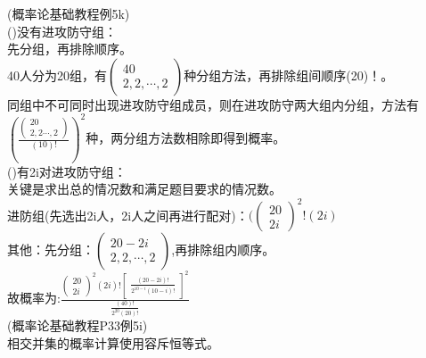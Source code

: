 \documentclass{book}%
\begin{document}
	(概率论基础教程例5k)\\
	()没有进攻防守组：\\
	先分组，再排除顺序。\\
	40人分为20组，有$\begin{pmatrix}40\\2,2,\cdots ,2\end{pmatrix}$种分组方法，再排除组间顺序(20)！。\\
	同组中不可同时出现进攻防守组成员，则在进攻防守两大组内分组，方法有${(\frac{\begin{pmatrix}20\\2,2\cdots ,2\end{pmatrix}}{(10)!})}^{2}$种，两分组方法数相除即得到概率。\\
	()有2i对进攻防守组：\\
	关键是求出总的情况数和满足题目要求的情况数。\\
	进防组(先选出2i人，2i人之间再进行配对)：$(\begin{pmatrix}20\\2i\end{pmatrix}^{2}!(2i)$\\
	其他：先分组：$\begin{pmatrix}20-2i\\2,2,\cdots ,2\end{pmatrix}$,再排除组内顺序。\\
	故概率为:$
	\frac{
	{\begin{pmatrix}20\\2i\end{pmatrix}}^{2}(2i)!
	{\begin{bmatrix}
		\frac
		{(20-2i)!}
		{2^{10-i}(10-i)!}
	\end{bmatrix}}^{2}}
    {\frac{(40)!}{2^{20}(20)!}
    }$
    ~\\
    
    (概率论基础教程P33例5i)\\
    相交并集的概率计算使用容斥恒等式。\\
    ~\\
    
\end{document}
